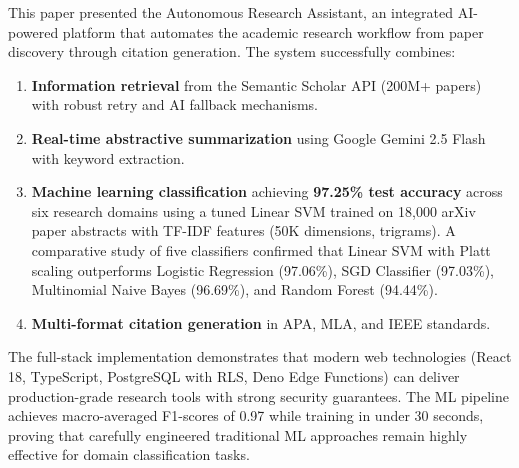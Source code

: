 \documentclass[conference]{IEEEtran}
\begin{document}
This paper presented the Autonomous Research Assistant, an integrated AI-powered platform that automates the academic research workflow from paper discovery through citation generation. The system successfully combines:

\begin{enumerate}
    \item \textbf{Information retrieval} from the Semantic Scholar API (200M+ papers) with robust retry and AI fallback mechanisms.
    \item \textbf{Real-time abstractive summarization} using Google Gemini 2.5 Flash with keyword extraction.
    \item \textbf{Machine learning classification} achieving \textbf{97.25\% test accuracy} across six research domains using a tuned Linear SVM trained on 18,000 arXiv paper abstracts with TF-IDF features (50K dimensions, trigrams). A comparative study of five classifiers confirmed that Linear SVM with Platt scaling outperforms Logistic Regression (97.06\%), SGD Classifier (97.03\%), Multinomial Naive Bayes (96.69\%), and Random Forest (94.44\%).
    \item \textbf{Multi-format citation generation} in APA, MLA, and IEEE standards.
\end{enumerate}

The full-stack implementation demonstrates that modern web technologies (React 18, TypeScript, PostgreSQL with RLS, Deno Edge Functions) can deliver production-grade research tools with strong security guarantees. The ML pipeline achieves macro-averaged F1-scores of 0.97 while training in under 30 seconds, proving that carefully engineered traditional ML approaches remain highly effective for domain classification tasks.
\end{document}

